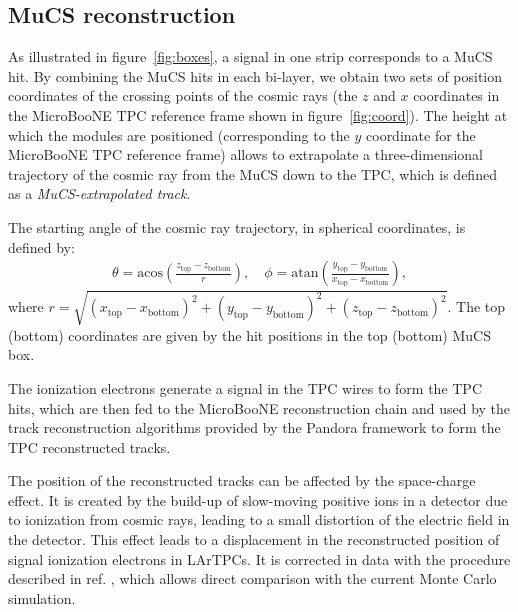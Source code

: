 \documentclass[a4paper,11pt]{article}
\begin{document}
\subsection{MuCS reconstruction}
As illustrated in figure~\ref{fig:boxes}, a signal in one strip corresponds to a MuCS hit. By combining the MuCS hits in each bi-layer, we obtain two sets of position coordinates of the crossing points of the cosmic rays (the $z$ and $x$ coordinates in the MicroBooNE TPC reference frame shown in figure~\ref{fig:coord}). The height at which the modules are positioned (corresponding to the $y$ coordinate for the MicroBooNE TPC reference frame) allows to extrapolate a three-dimensional trajectory of the cosmic ray from the MuCS down to the TPC, which is defined as a \emph{MuCS-extrapolated track}.

The starting angle of the cosmic ray trajectory, in spherical coordinates, is defined by:
\begin{align}\label{eq:angles_mucs}
  \theta = \mathrm{acos}\left(\frac{z_{\mathrm{top}}-z_{\mathrm{bottom}}}{r}\right), \quad
  \phi = \mathrm{atan}\left(\frac{y_{\mathrm{top}}-y_{\mathrm{bottom}}}{x_{\mathrm{top}}-x_{\mathrm{bottom}}}\right),
\end{align}
where $r = \sqrt{(x_{\mathrm{top}}-x_{\mathrm{bottom}})^2+(y_{\mathrm{top}}-y_{\mathrm{bottom}})^2+(z_{\mathrm{top}}-z_{\mathrm{bottom}})^2}$. The top (bottom) coordinates are given by the hit positions in the top (bottom) MuCS box.

The ionization electrons generate a signal in the TPC wires to form the TPC hits, which are then fed to the MicroBooNE reconstruction chain and used by the track reconstruction algorithms provided by the Pandora framework \cite{pandora} to form the TPC reconstructed tracks.

The position of the reconstructed tracks can be affected by the space-charge effect. It is created by the build-up of slow-moving positive ions in a detector due to ionization from cosmic rays, leading to a small distortion of the electric field in the detector. This effect leads to a displacement in the reconstructed position of signal ionization electrons in LArTPCs. It is corrected in data with the procedure described in ref. \cite{sce}, which allows direct comparison with the current Monte Carlo simulation.
\end{document}
